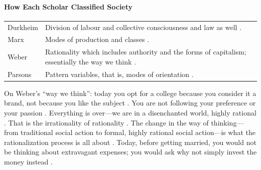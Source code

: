 \paragraph{How Each Scholar Classified Society}
\vspace{6pt}
\noindent
\begin{tabularx}{\textwidth}{>{\hsize}Y >{\hsize}Y}
\toprule
{}
 &  \\
\midrule
Durkheim & Division of labour and collective consciousness and law as well . \\
\midrule
Marx & Modes of production and classes . \\
\midrule
Weber & Rationality which includes authority and the forms of capitalism; essentially the way we think . \\
\midrule
Parsons & Pattern variables, that is, modes of orientation . \\
\bottomrule
\end{tabularx}
\vspace{6pt}

\begin{ExampleBox}
On Weber's ``way we think'': today you opt for a college because you consider it a brand, not because you like the subject . You are not following your preference or your passion . Everything is over---we are in a disenchanted world, highly rational . That is the irrationality of rationality .
The change in the way of thinking---from traditional social action to formal, highly rational social action---is what the rationalization process is all about . Today, before getting married, you would not be thinking about extravagant expenses; you would ask why not simply invest the money instead .
\end{ExampleBox}

